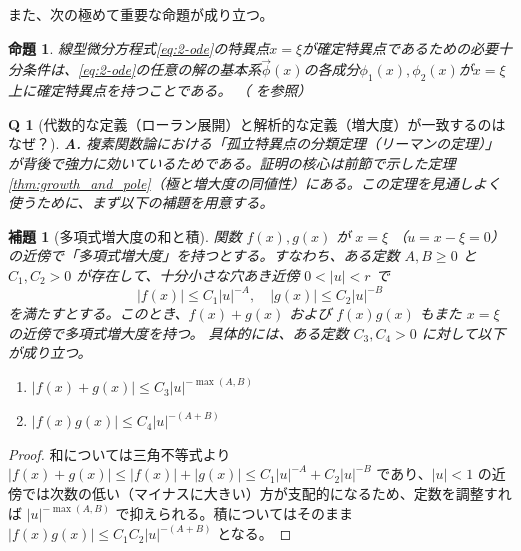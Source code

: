 \documentclass[paper=a4, fontsize=11pt]{jlreq} %
\theoremstyle{break}
\newtheorem{proposition}[theorem]{命題}
\newtheorem{lemma}[theorem]{補題}
\theoremstyle{qa}
\newtheorem*{Q}{Q}
\theoremstyle{remark} %
\begin{document}
また、次の極めて重要な命題が成り立つ。

\begin{proposition}\label{prop:equivalence_regular_singular}
    線型微分方程式\eqref{eq:2-ode}の特異点$x=\xi$が確定特異点であるための必要十分条件は、\eqref{eq:2-ode}の任意の解の基本系$\vec{\phi}(x)$の各成分$\phi_{1}(x),\phi_{2}(x)$が$x=\xi$上に確定特異点を持つことである。
    （\cite[p.61 命題2.6]{book:okamoto} を参照）
\end{proposition}

\begin{Q}[代数的な定義（ローラン展開）と解析的な定義（増大度）が一致するのはなぜ？]
\textbf{A.} 複素関数論における「孤立特異点の分類定理（リーマンの定理）」が背後で強力に効いているためである。証明の核心は前節で示した定理\ref{thm:growth_and_pole}（極と増大度の同値性）にある。この定理を見通しよく使うために、まず以下の補題を用意する。
\end{Q}

\begin{lemma}[多項式増大度の和と積]\label{lem:polynomial_growth_closure}
関数 $f(x), g(x)$ が $x=\xi$ （$u = x-\xi = 0$）の近傍で「多項式増大度」を持つとする。すなわち、ある定数 $A, B \ge 0$ と $C_1, C_2 > 0$ が存在して、十分小さな穴あき近傍 $0 < |u| < r$ で
\[
|f(x)| \le C_1|u|^{-A}, \quad |g(x)| \le C_2|u|^{-B}
\]
を満たすとする。このとき、$f(x)+g(x)$ および $f(x)g(x)$ もまた $x=\xi$ の近傍で多項式増大度を持つ。
具体的には、ある定数 $C_3, C_4 > 0$ に対して以下が成り立つ。
\begin{enumerate}
    \item $|f(x)+g(x)| \le C_3|u|^{-\max(A, B)}$
    \item $|f(x)g(x)| \le C_4|u|^{-(A+B)}$
\end{enumerate}
\end{lemma}

\begin{proof}
和については三角不等式より $|f(x)+g(x)| \le |f(x)| + |g(x)| \le C_1|u|^{-A} + C_2|u|^{-B}$ であり、$|u|<1$ の近傍では次数の低い（マイナスに大きい）方が支配的になるため、定数を調整すれば $|u|^{-\max(A, B)}$ で抑えられる。積についてはそのまま $|f(x)g(x)| \le C_1 C_2 |u|^{-(A+B)}$ となる。
\end{proof}
\end{document}
